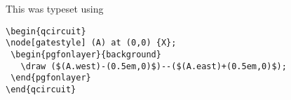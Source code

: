 \documentclass[twocolumn,nofootinbib,aps,,pra]{revtex4-1}
\begin{document}
This was typeset using
{\small \begin{verbatim}\begin{qcircuit}
\node[gatestyle] (A) at (0,0) {X};
 \begin{pgfonlayer}{background}
   \draw ($(A.west)-(0.5em,0)$)--($(A.east)+(0.5em,0)$);
 \end{pgfonlayer}
\end{qcircuit}
\end{verbatim}}
%
%
%
%
%
\end{document}
